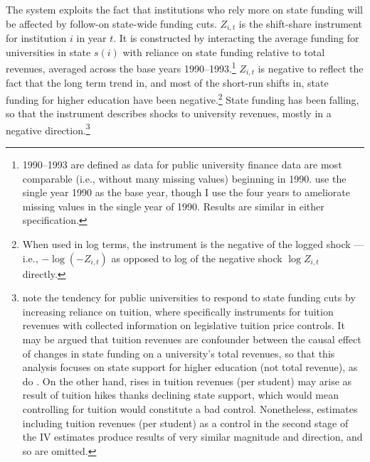 The system exploits the fact that institutions who rely more on state funding will be affected by follow-on state-wide funding cuts.
$Z_{i,t}$ is the shift-share instrument for institution $i$ in year $t$.
It is constructed by interacting the average funding for universities in state $s(i)$ with reliance on state funding relative to total revenues, averaged across the base years 1990--1993.\footnote{
    1990--1993 are defined as data for public university finance data are most comparable (i.e., without many missing values) beginning in 1990.
    \cite{NBERw23736} use the single year 1990 as the base year, though I use the four years to ameliorate missing values in the single year of 1990.
    Results are similar in either specification.
}
$Z_{i,t}$ is negative to reflect the fact that the long term trend in, and most of the short-run shifts in, state funding for higher education have been negative.\footnote{
    When used in log terms, the instrument is the negative of the logged shock --- i.e., $- \log \left( -Z_{i,t} \right)$ as opposed to log of the negative shock $\log Z_{i,t}$ directly.
}
State funding has been falling, so that the instrument describes shocks to university revenues, mostly in a negative direction.\footnote{
    \label{foot:control}
    \cite{NBERw27885} note the tendency for public universities to respond to state funding cuts by increasing reliance on tuition, where \cite{NBERw23736} specifically instruments for tuition revenues with collected information on legislative tuition price controls.
    It may be argued that tuition revenues are confounder between the causal effect of changes in state funding on a university's total revenues, so that this analysis focuses on state support for higher education (not total revenue), as do \cite{NBERw27885}.
    On the other hand, rises in tuition revenues (per student) may arise as result of tuition hikes thanks declining state support, which would mean controlling for tuition would constitute a bad control.
    Nonetheless, estimates including tuition revenues (per student) as a control in the second stage of the IV estimates produce results of very similar magnitude and direction, and so are omitted.
}

